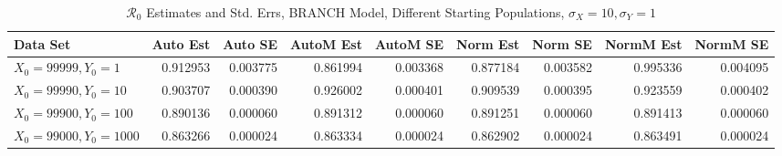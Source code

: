\documentclass[12pt]{article}
\newcommand{\rr}{\ensuremath{\mathcal{R}_0}}
\begin{document}
\begin{table}[H]
	
	\caption{$\rr$ Estimates and Std. Errs, BRANCH Model,
		Different Starting Populations, 
		$\sigma_X = 10, \sigma_Y = 1$}
	\begin{footnotesize}
		\hskip -1.7cm
		\begin{tabular}{l|r|r|r|r|r|r|r|r}
			\hline
			Data Set & Auto Est & Auto SE & AutoM Est & AutoM SE & Norm Est & Norm SE & NormM Est & NormM SE\\
			\hline
			$X_0 = 99999, Y_0 = 1$ & 0.912953 & 0.003775 & 0.861994 & 0.003368 & 0.877184 & 0.003582 & 0.995336 & 0.004095\\
			\hline
			$X_0 = 99990, Y_0 = 10$ & 0.903707 & 0.000390 & 0.926002 & 0.000401 & 0.909539 & 0.000395 & 0.923559 & 0.000402\\
			\hline
			$X_0 = 99900, Y_0 = 100$ & 0.890136 & 0.000060 & 0.891312 & 0.000060 & 0.891251 & 0.000060 & 0.891413 & 0.000060\\
			\hline
			$X_0 = 99000, Y_0 = 1000$ & 0.863266 & 0.000024 & 0.863334 & 0.000024 & 0.862902 & 0.000024 & 0.863491 & 0.000024\\
			\hline
		\end{tabular}
	\end{footnotesize}
\end{table}
\end{document}
